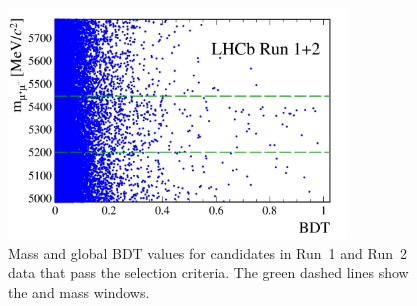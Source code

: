 \begin{figure}[tbp]
    \centering
    \includegraphics[width=0.8\textwidth]{./Figs/Selection/hidef_Fig3.png}
    \caption{Mass and global BDT values for candidates in Run~1 and Run~2 data that pass the \bmumu selection criteria. The green dashed lines show the \bs and \bd mass windows.}
    \label{fig:BFdata}
\end{figure}

